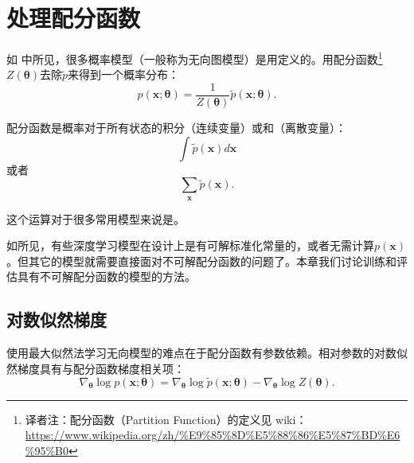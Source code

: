 \chapter{处理配分函数}
\label{chap:18}


如 中所见，很多概率模型（一般称为无向图模型）是用定义的。用配分函数\footnote{译者注：配分函数（Partition Function）的定义见 wiki：\url{https://www.wikipedia.org/zh/\%E9\%85\%8D\%E5\%88\%86\%E5\%87\%BD\%E6\%95\%B0}}\(Z(\bm{\theta})\)去除\(\widetilde{p}\)来得到一个概率分布：
\begin{equation}
    p(\bm{x};\bm{\theta})
    = \frac{1}{Z(\bm{\theta})}\widetilde{p}(\bm{x};\bm{\theta}).
\end{equation}

配分函数是概率对于所有状态的积分（连续变量）或和（离散变量）： 
\begin{equation}
    \int\widetilde{p}(\bm{x})d\bm{x}
\end{equation}
 或者
 \begin{equation}
     \sum_{\bm{x}}\widetilde{p}(\bm{x}).
 \end{equation}

这个运算对于很多常用模型来说是。

如所见，有些深度学习模型在设计上是有可解标准化常量的，或者无需计算\(p(\bm{x})\)。但其它的模型就需要直接面对不可解配分函数的问题了。本章我们讨论训练和评估具有不可解配分函数的模型的方法。

\section{对数似然梯度}
\label{sec:18.1}

使用最大似然法学习无向模型的难点在于配分函数有参数依赖。相对参数的对数似然梯度具有与配分函数梯度相关项：
\begin{equation}
    \nabla_{\bm{\theta}}\log{p(\bm{x};\bm{\theta})}
    = \nabla_{\bm{\theta}}\log{\widetilde{p}(\bm{x};\bm{\theta})}
    - \nabla_{\bm{\theta}}\log{Z(\bm{\theta})}.
\end{equation}

